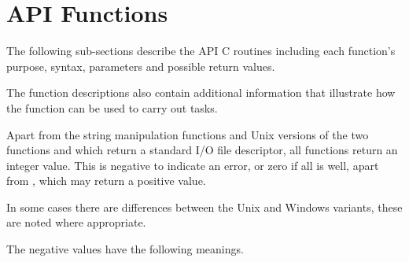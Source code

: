 \chapter{API Functions}
\label{chp:api-functions}
The following sub-sections describe the \ProductName{} API C routines including each function's purpose, syntax, parameters
and possible return values.

The function descriptions also contain additional information that illustrate how the function can be used to carry out tasks.

Apart from the string manipulation functions and Unix versions of the two functions \funcXBjobadd{} and
\funcXBjobdata{} which return a standard I/O file descriptor, all functions return an integer value. This is negative to
indicate an error, or zero if all is well, apart from \funcXBopen{}, which may return a positive value.

In some cases there are differences between the Unix and Windows variants, these are noted where appropriate.

The negative values have the following meanings.

\bigskip


